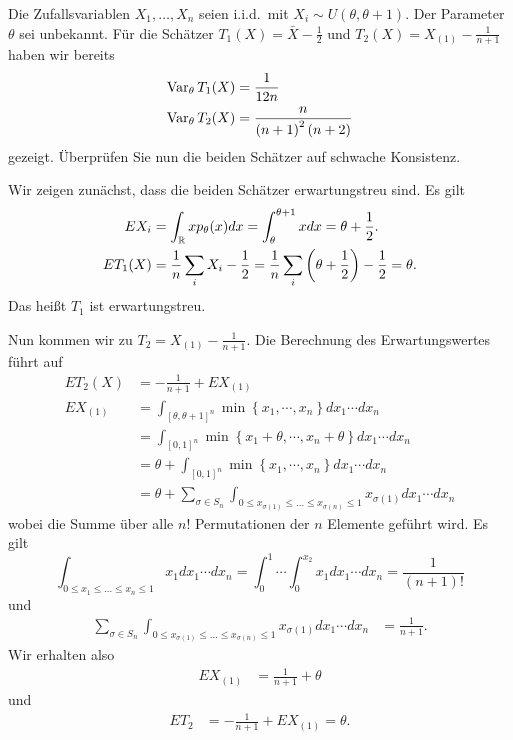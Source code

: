 Die Zufallsvariablen $X_1,\ldots,X_n$ seien i.i.d.\ mit $X_i\sim U(\theta,\theta+1)$.
Der Parameter $\theta$ sei unbekannt. Für die Schätzer $T_1(X) = \bar X -\frac{1}{2}$
und $T_2(X)=X_{(1)} - \frac{1}{n+1}$ haben wir bereits
\begin{align*}
    \operatorname{Var}_\theta T_1(X) &= \frac{1}{12 n} \\
    \operatorname{Var}_\theta T_2(X) &= \frac{n}{\left( n+1 \right)^2\left( n+2 \right)}
\end{align*}
gezeigt. Überprüfen Sie nun die beiden Schätzer auf schwache Konsistenz.

\solution 
Wir zeigen zunächst, dass die beiden Schätzer erwartungstreu sind. 
Es gilt
\begin{align*}
	E X_i &=  \int_{\mathbb R}^{} x p_\theta(x) dx 
        = \int_{\theta}^{\theta+1} x dx = \theta + \frac{1}{2}. \\
	E T_1(X) &=  \frac{1}{n} \sum_{i}^{} X_i - \frac{1}{2} 
        = \frac{1}{n} \sum_{i}^{} \left( \theta + \frac{1}{2} \right) -\frac{1}{2} = \theta.
\end{align*}
Das heißt $T_1$ ist erwartungstreu.

Nun kommen wir zu $T_2 = X_{(1)}-\frac{1}{n+1}$. Die Berechnung des Erwartungswertes führt auf
\begin{align*}
	E T_2(X) &= -\frac{1}{n+1} + E X_{(1)} \\
	E X_{(1)} &= \int_{[\theta,\theta+1]^n}^{} \min\left\{ x_1,\cdots,x_n \right\} dx_1\cdots d x_n \\
	&= \int_{[0,1]^n}^{} \min\left\{ x_1+\theta,\cdots,x_n+\theta \right\} dx_1\cdots d x_n \\
	&= \theta + \int_{[0,1]^n}^{} \min\left\{ x_1,\cdots,x_n \right\} dx_1\cdots d x_n \\
	&= \theta +\sum_{\sigma\in S_n}^{} \int_{0\leq x_{\sigma(1)}\leq \ldots \leq x_{\sigma(n)}\leq 1} x_{\sigma(1)} dx_1 \cdots dx_n 
\end{align*}
wobei die Summe über alle $n!$ Permutationen der $n$ Elemente geführt wird. Es
gilt
\begin{equation*}
	\int_{0\leq x_1\leq \ldots\leq x_n\leq 1} x_1 dx_1 \cdots d x_n = 
	\int_{0}^{1}\cdots \int_{0}^{x_2} x_1 dx_1 \cdots dx_n = 
	\frac{1}{\left( n+1 \right)!}
\end{equation*}
und
\begin{align*}
	\sum_{\sigma\in S_n}^{} \int_{0\leq x_{\sigma(1)}\leq \ldots \leq x_{\sigma(n)}\leq 1} x_{\sigma(1)} dx_1 \cdots dx_n 
	&=\frac{1}{n+1}.
\end{align*}
Wir erhalten also
\begin{align*}
	E X_{(1)} &= \frac{1}{n+1} + \theta
\end{align*}
und 
\begin{align*}
	E T_2 &= -\frac{1}{n+1} + E X_{(1)} = \theta.
\end{align*}

